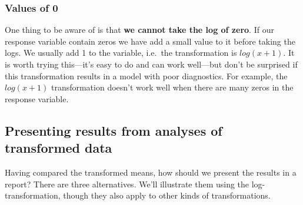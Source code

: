 \documentclass[
]{book}
\newenvironment{greybox}{
  \definecolor{shadecolor}{rgb}{0.95,0.95,0.95}  %
  \color{black}
  \begin{shaded}}
 {\end{shaded}}
\newenvironment{infobox}[1]
  {
  \begin{itemize}
  \renewcommand{\labelitemi}{
    \raisebox{-.7\height}[0pt][0pt]{
      {\setkeys{Gin}{width=3em,keepaspectratio}
        \texttt{[image: images/\#1]}}
    }
  }
  \setlength{\fboxsep}{1em}
  \begin{greybox}
  \item
  }
  {
  \end{greybox}
  \end{itemize}
  }
\begin{document}
\begin{infobox}{information}

\hypertarget{values-of-0}{%
\subsubsection*{Values of 0}\label{values-of-0}}

One thing to be aware of is that \textbf{we cannot take the log of zero}. If our response variable contain zeros we have add a small value to it before taking the logs. We usually add 1 to the variable, i.e.~the transformation is \(log(x+1)\). It is worth trying this---it's easy to do and can work well---but don't be surprised if this transformation results in a model with poor diagnostics. For example, the \(log(x+1)\) transformation doesn't work well when there are many zeros in the response variable.

\end{infobox}

\hypertarget{presenting-results-from-analyses-of-transformed-data}{%
\subsection{Presenting results from analyses of transformed data}\label{presenting-results-from-analyses-of-transformed-data}}

Having compared the transformed means, how should we present the results in a report? There are three alternatives. We'll illustrate them using the log-transformation, though they also apply to other kinds of transformations.
\end{document}
